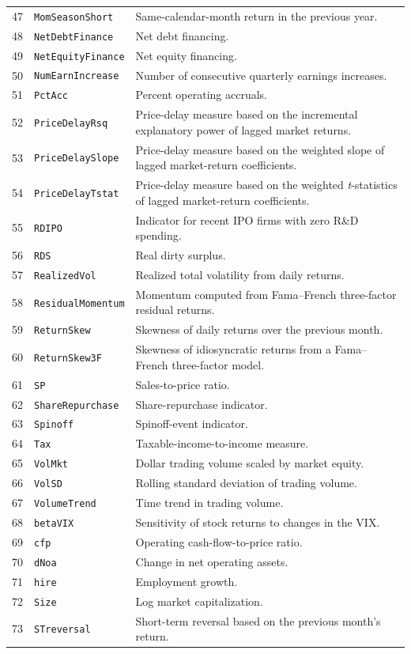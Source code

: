 \documentclass[11pt,letterpaper]{article}
\begin{document}
{\begin{longtable}{@{} r p{} p{} @{}}
  47 & \texttt{MomSeasonShort} & Same-calendar-month return in the previous year. \\
  48 & \texttt{NetDebtFinance} & Net debt financing. \\
  49 & \texttt{NetEquityFinance} & Net equity financing. \\
  50 & \texttt{NumEarnIncrease} & Number of consecutive quarterly earnings increases. \\
  51 & \texttt{PctAcc} & Percent operating accruals. \\
  52 & \texttt{PriceDelayRsq} & Price-delay measure based on the incremental explanatory power of lagged market returns. \\
  53 & \texttt{PriceDelaySlope} & Price-delay measure based on the weighted slope of lagged market-return coefficients. \\
  54 & \texttt{PriceDelayTstat} & Price-delay measure based on the weighted \emph{t}-statistics of lagged market-return coefficients. \\
  55 & \texttt{RDIPO} & Indicator for recent IPO firms with zero R\&D spending. \\
  56 & \texttt{RDS} & Real dirty surplus. \\
  57 & \texttt{RealizedVol} & Realized total volatility from daily returns. \\
  58 & \texttt{ResidualMomentum} & Momentum computed from Fama--French three-factor residual returns. \\
  59 & \texttt{ReturnSkew} & Skewness of daily returns over the previous month. \\
  60 & \texttt{ReturnSkew3F} & Skewness of idiosyncratic returns from a Fama--French three-factor model. \\
  61 & \texttt{SP} & Sales-to-price ratio. \\
  62 & \texttt{ShareRepurchase} & Share-repurchase indicator. \\
  63 & \texttt{Spinoff} & Spinoff-event indicator. \\
  64 & \texttt{Tax} & Taxable-income-to-income measure. \\
  65 & \texttt{VolMkt} & Dollar trading volume scaled by market equity. \\
  66 & \texttt{VolSD} & Rolling standard deviation of trading volume. \\
  67 & \texttt{VolumeTrend} & Time trend in trading volume. \\
  68 & \texttt{betaVIX} & Sensitivity of stock returns to changes in the VIX. \\
  69 & \texttt{cfp} & Operating cash-flow-to-price ratio. \\
  70 & \texttt{dNoa} & Change in net operating assets. \\
  71 & \texttt{hire} & Employment growth. \\
  72 & \texttt{Size} & Log market capitalization. \\
  73 & \texttt{STreversal} & Short-term reversal based on the previous month's return. \\
\end{longtable}
}
\end{document}
